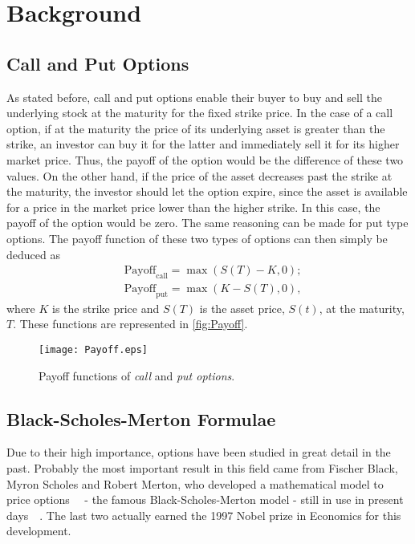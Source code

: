 \chapter{Background}
\label{chapter:background}
\section{Call and Put Options}
As stated before, call and put options enable their buyer to buy and sell the underlying stock at the maturity for the fixed strike price.
In the case of a call option, if at the maturity the price of its underlying asset is greater than the strike, an investor can buy it for the latter and immediately sell it for its higher market price. Thus, the payoff of the option would be the difference of these two values. On the other hand, if the price of the asset decreases past the strike at the maturity, the investor should let the option expire, since the asset is available for a price in the market price lower than the higher strike. In this case, the payoff of the option would be zero.
The same reasoning can be made for put type options.
The payoff function of these two types of options can then simply be deduced as
\begin{equation}\label{callput}
\begin{split}
&\text{Payoff}_\text{call}=\max\left(S(T)-K,0\right);\\
&\text{Payoff}_\text{put}=\max\left(K-S(T),0\right),
\end{split}
\end{equation}
\noindent where $K$ is the strike price and $S(T)$ is the asset price, $S(t)$, at the maturity, $T$. These functions are represented in \autoref{fig:Payoff}.

\begin{figure}[!htb]
    \centering
      \texttt{[image: Payoff.eps]}
      \caption[Payoff functions of call and put options]{Payoff functions of \emph{call} and \emph{put options}.}\label{fig:Payoff}
    \end{figure}
    
\section{Black-Scholes-Merton Formulae}
\label{section:Black-Scholes-Merton Formulae}
Due to their high importance, options have been studied in great detail in the past.
Probably the most important result in this field came from Fischer Black, Myron Scholes and Robert Merton, who developed a mathematical model to price options~~\cite{Scholes} - the famous Black-Scholes-Merton model - still in use in present days~~\cite{Wilmott}. The last two actually earned the 1997 Nobel prize in Economics for this development.

